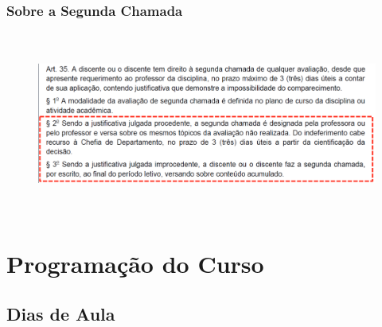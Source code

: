 \documentclass{beamer}
\begin{document}
\begin{frame}
	\frametitle{Sobre a Segunda Chamada}
	\begin{figure}
		\includegraphics[width=11.5cm, height=6cm]{SegChamada.png}
	\end{figure}
\end{frame}

\section{Programação do Curso}
\subsection{Dias de Aula}
\end{document}
